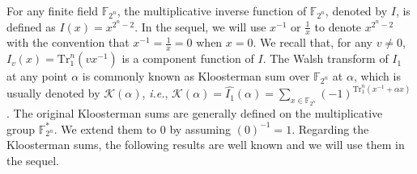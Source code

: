 \documentclass{article}
\newcommand{\F}{\mathbb{F}}
\newcommand{\0}{\textbf{0}}
\newcommand{\1}{\textbf{1}}
\theoremstyle{plain}
\newtheorem{lemma}{Lemma}
\newtheorem{remark}{Remark}
\begin{document}
    For any finite field $\F_{2^n}$, the multiplicative inverse function of $\F_{2^n}$, denoted by $I$, is defined as $I(x)=x^{2^n-2}$. In the sequel, we will use $x^{-1}$ or $\frac{1}{x}$ to
    denote $x^{2^n-2}$ with the convention that $x^{-1}=\frac{1}{x}=0$ when $x=0$. We recall that, for any $v \neq 0$, $I_v(x) = \mathrm{Tr}_1^n(vx^{-1})$ is a component function of $I$.
    The Walsh transform of $I_1$ at any point $\alpha$ is commonly known as Kloosterman sum over $\F_{2^n}$ at $\alpha$, which is usually denoted by $\mathcal{K}(\alpha)$,
    \emph{i.e.}, $\mathcal{K}(\alpha)=\widehat{I_1}(\alpha)=\sum_{x\in\F_{2^n}}(-1)^{\mathrm{Tr}_1^n(x^{-1}+\alpha x)}$.
    The original Kloosterman sums are generally defined on the multiplicative group $\F_{2^n}^*$. We extend them to $0$ by assuming $(0)^{-1}=1$. Regarding the Kloosterman sums,
    the following results are well known and we will use them in the sequel.
\end{document}
